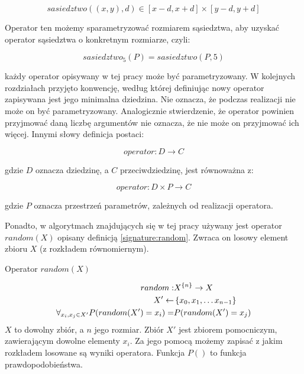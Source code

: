 \documentclass[./FM_mgr.tex]{subfiles}
\begin{document}
\begin{displaymath}
	sasiedztwo((x, y), d) \in [x-d, x+d] \times [y-d, y+d]
\end{displaymath}

Operator ten możemy sparametryzować rozmiarem sąsiedztwa, aby uzyskać operator sąsiedztwa o konkretnym rozmiarze, czyli:

\begin{displaymath}
	sasiedztwo_5 (P) = sasiedztwo (P, 5)
\end{displaymath}

\Defacto każdy operator opisywany w tej pracy może być parametryzowany. 
W kolejnych rozdziałach przyjęto konwencję, według której definiując nowy operator zapisywana jest jego minimalna dziedzina. 
Nie oznacza, że podczas realizacji nie może on być parametryzowany. 
Analogicznie stwierdzenie, że operator powinien przyjmować daną liczbę argumentów nie oznacza, że nie może on przyjmować ich więcej. 
Innymi słowy definicja postaci:

\begin{displaymath}
	operator: D \rightarrow C
\end{displaymath}

gdzie $D$ oznacza dziedzinę, a $C$ przeciwdziedzinę, jest równoważna z:

\begin{displaymath}
	operator: D \times P \rightarrow C
\end{displaymath}

gdzie $P$ oznacza przestrzeń parametrów, zależnych od realizacji operatora.

Ponadto, w algorytmach znajdujących się w tej pracy używany jest operator $random(X)$ opisany definicją \ref{signature:random}.
Zwraca on losowy element zbioru $X$ (z rozkładem równomiernym).

\begin{signature}
	\caption{Operator $random(X)$ \label{signature:random}}
	\begin{align}
		random: &{X}^{ \{ n \}} \rightarrow X \\
		X' \gets &\left\{ x_0, x_1, \dots x_{n-1} \right\} \\
		\forall_{x_i, x_j \in X'} P(random(X') = x_i) = &P(random(X') = x_j)
	\end{align}
	$X$ to dowolny zbiór, a $n$ jego rozmiar.
	Zbiór $X'$ jest zbiorem pomocniczym, zawierającym dowolne elementy $x_i$.
	Za jego pomocą możemy zapisać z jakim rozkładem losowane są wyniki operatora.
	Funkcja $P()$ to funkcja prawdopodobieństwa.
\end{signature}
\end{document}
